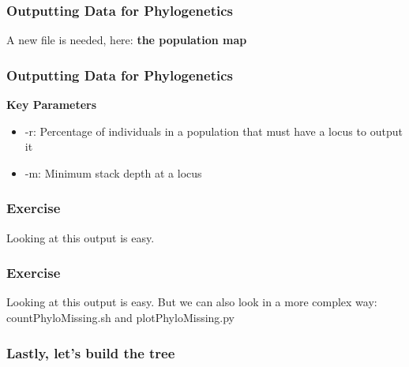\documentclass{beamer}
\begin{document}
\begin{frame}
\frametitle{Outputting Data for Phylogenetics}
A new file is needed, here: \textbf{the population map}
\end{frame}

\begin{frame}
\frametitle{Outputting Data for Phylogenetics}
\textbf{Key Parameters}
\begin{itemize}
\item -r: Percentage of individuals in a population that must have a locus to output it
\item -m: Minimum stack depth at a locus
\end{itemize}
\end{frame}

\begin{frame}
\frametitle{Exercise}
Looking at this output is easy.
\end{frame}

\begin{frame}
\frametitle{Exercise}
Looking at this output is easy.
But we can also look in a more complex way: countPhyloMissing.sh and plotPhyloMissing.py
\end{frame}

\begin{frame}
\frametitle{Lastly, let's build the tree}

\end{frame}
\end{document}

